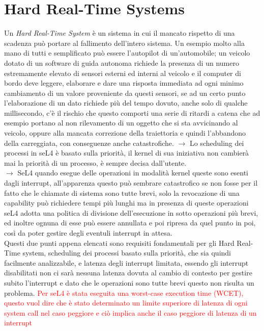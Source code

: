 \section{Hard Real-Time Systems}
Un \textit{Hard Real-Time System} è un sistema in cui il mancato rispetto di una scadenza può portare al fallimento dell'intero sistema. Un esempio molto alla mano di tutti e semplificato può essere l'autopilot di un'automobile; un veicolo dotato di un software di guida autonoma richiede la presenza di un numero estremamente elevato di sensori esterni ed interni al veicolo e il computer di bordo deve leggere, elaborare e dare una risposta immediata ad ogni minimo cambiamento di un valore proveniente da questi sensori, se ad un certo punto l'elaborazione di un dato richiede più del tempo dovuto, anche solo di qualche millisecondo, c'è il rischio che questo comporti una serie  di ritardi a catena che ad esempio portano al non rilevamento di un oggetto che si sta avvicinando al veicolo, oppure alla mancata correzione della traiettoria e quindi l'abbandono della carreggiata, con conseguenze anche catastrofiche.
$\rightarrow$ Lo scheduling dei processi in seL4 è basato sulla priorità, il kernel di sua iniziativa non cambierà mai la priorità di un processo, è sempre decisa dall'utente.\\
$\rightarrow$ SeL4 quando esegue delle operazioni in modalità kernel queste sono esenti dagli interrupt, all'apparenza questo può sembrare catastrofico se non fosse per il fatto che le chiamate di sistema sono tutte brevi, solo la revocazione di una capability può richiedere tempi più lunghi ma in presenza di queste operazioni seL4 adotta una politica di divisione dell'esecuzione in sotto operazioni più brevi, ed inoltre ognuna di esse può essere annullata e poi ripresa da quel punto in poi, così da poter gestire degli eventuli interrupt in attesa.\\
Questi due punti appena elencati sono requisiti fondamentali per gli Hard Real-Time system, scheduling dei processi basato sulla priorità, che sia quindi facilmente analizzabile, e latenza degli interrupt limitata, essendo gli interrupt disabilitati non ci sarà nessuna latenza dovuta al cambio di contesto per gestire subito l'interrupt e dato che le operazioni sono tutte brevi questo non risulta un problema.
\textcolor{red}{Per seL4 è stata eseguita una worst-case execution time (WCET), questo vuol dire che è stato determinato un limite superiore di latenza di ogni system call nel caso peggiore e ciò implica anche il caso peggiore di latenza di un interrupt}

